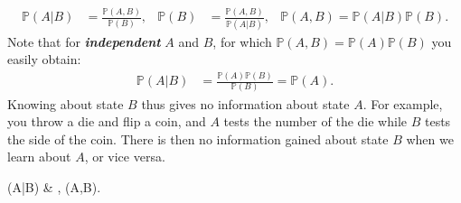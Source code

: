 \documentclass{article}
\begin{document}
\begin{align}
    \mathbb{P}(A|B)&=\frac{\mathbb{P}(A,B)}{\mathbb{P}(B)},& \mathbb{P}(B)&=\frac{\mathbb{P}(A,B)}{\mathbb{P}(A|B)},& \mathbb{P}(A,B)=\mathbb{P}(A|B)\mathbb{P}(B).
\end{align}
Note that for \textbf{\textit{independent}} $A$ and $B$, for which $\mathbb{P}(A,B)=\mathbb{P}(A)\mathbb{P}(B)$ you easily obtain:
\begin{align}
    \mathbb{P}(A|B)&=\frac{\mathbb{P}(A)\mathbb{P}(B)}{\mathbb{P}(B)}=\mathbb{P}(A).
\end{align}
Knowing about state $B$ thus gives no information about state $A$.
For example, you throw a die and flip a coin, and $A$ tests the number of the die while $B$ tests the side of the coin. There is then no information gained about state $B$ when we learn about $A$, or vice versa.

\begin{mymathbox}[ams align, title={Conditional probability of $(A,B)\in\Omega$ (definition)}, colframe=blue!30!black, center title]
	(A|B) & \equiv {}, \quad \forall (A,B)\in\Omega.
\end{mymathbox}
\end{document}
